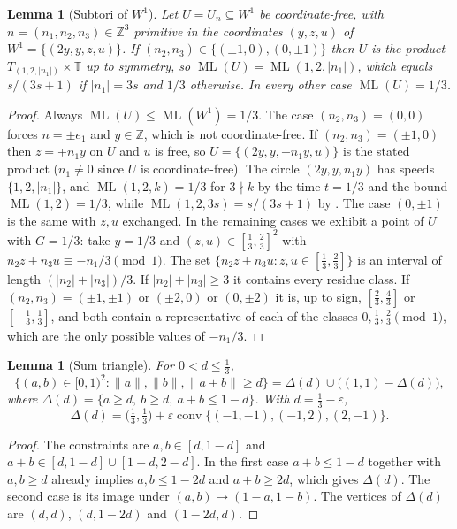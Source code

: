 \documentclass[12pt]{amsart}
\newtheorem{lemma}[theorem]{Lemma}
\theoremstyle{definition}\newtheorem{definition}[theorem]{Definition}
\theoremstyle{remark}\newtheorem{remark}[theorem]{Remark}
\newcommand{\Z}{\mathbb Z}\newcommand{\R}{\mathbb R}\newcommand{\T}{\mathbb T}
\newcommand{\norm}[1]{\lVert #1\rVert}
\newcommand{\ML}{\operatorname{ML}}
\newcommand{\Wone}{W^{1}}\newcommand{\Wtwo}{W^{2}}
\begin{document}
\begin{lemma}[Subtori of $\Wone$]\label{lem:W1sub}
Let $U=U_n\subseteq\Wone$ be coordinate-free, with $n=(n_1,n_2,n_3)\in\Z^3$ primitive in the coordinates $(y,z,u)$ of $\Wone=\{(2y,y,z,u)\}$. If $(n_2,n_3)\in\{(\pm1,0),(0,\pm1)\}$ then $U$ is the product $T_{(1,2,|n_1|)}\times\T$ up to symmetry, so $\ML(U)=\ML(1,2,|n_1|)$, which equals $s/(3s+1)$ if $|n_1|=3s$ and $1/3$ otherwise. In every other case $\ML(U)=1/3$.
\end{lemma}
\begin{proof}
Always $\ML(U)\le\ML(\Wone)=1/3$. The case $(n_2,n_3)=(0,0)$ forces $n=\pm e_1$ and $y\in\Z$, which is not coordinate-free. If $(n_2,n_3)=(\pm1,0)$ then $z=\mp n_1y$ on $U$ and $u$ is free, so $U=\{(2y,y,\mp n_1y,u)\}$ is the stated product ($n_1\ne0$ since $U$ is coordinate-free). The circle $(2y,y,n_1y)$ has speeds $\{1,2,|n_1|\}$, and $\ML(1,2,k)=1/3$ for $3\nmid k$ by the time $t=1/3$ and the bound $\ML(1,2)=1/3$, while $\ML(1,2,3s)=s/(3s+1)$ by \cite[Theorem~5.1]{Kravitz}. The case $(0,\pm1)$ is the same with $z,u$ exchanged. In the remaining cases we exhibit a point of $U$ with $G=1/3$: take $y=1/3$ and $(z,u)\in[\frac13,\frac23]^2$ with $n_2z+n_3u\equiv-n_1/3\pmod 1$. The set $\{n_2z+n_3u:z,u\in[\frac13,\frac23]\}$ is an interval of length $(|n_2|+|n_3|)/3$. If $|n_2|+|n_3|\ge3$ it contains every residue class. If $(n_2,n_3)=(\pm1,\pm1)$ or $(\pm2,0)$ or $(0,\pm2)$ it is, up to sign, $[\frac23,\frac43]$ or $[-\frac13,\frac13]$, and both contain a representative of each of the classes $0,\frac13,\frac23\pmod1$, which are the only possible values of $-n_1/3$.
\end{proof}

\begin{lemma}[Sum triangle]\label{lem:sumcells}
For $0<d\le\frac13$,
\[
 \{(a,b)\in[0,1)^2:\norm a,\norm b,\norm{a+b}\ge d\}=\Delta(d)\cup\bigl((1,1)-\Delta(d)\bigr),
\]
where $\Delta(d)=\{a\ge d,\ b\ge d,\ a+b\le 1-d\}$. With $d=\frac13-\varepsilon$,
\[
 \Delta(d)=\bigl(\tfrac13,\tfrac13\bigr)+\varepsilon\operatorname{conv}\{(-1,-1),(-1,2),(2,-1)\}.
\]
\end{lemma}
\begin{proof}
The constraints are $a,b\in[d,1-d]$ and $a+b\in[d,1-d]\cup[1+d,2-d]$. In the first case $a+b\le1-d$ together with $a,b\ge d$ already implies $a,b\le 1-2d$ and $a+b\ge 2d$, which gives $\Delta(d)$. The second case is its image under $(a,b)\mapsto(1-a,1-b)$. The vertices of $\Delta(d)$ are $(d,d)$, $(d,1-2d)$ and $(1-2d,d)$.
\end{proof}
\end{document}
